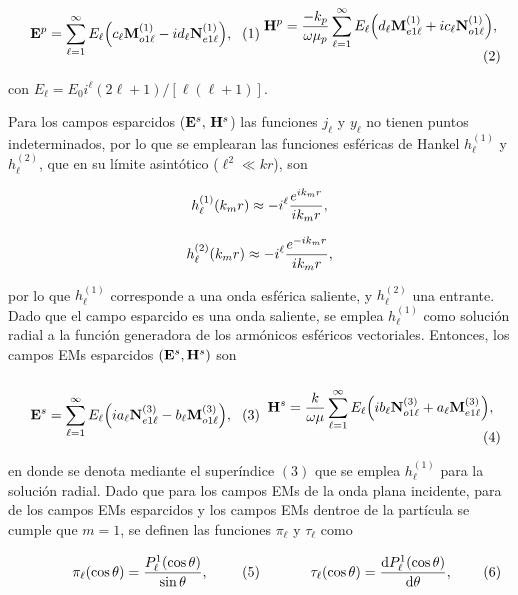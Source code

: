 \documentclass[letterpaper,11pt] {article}
\newcommand{\beqhalf}{\noindent \begin{minipage}[c]{.5\linewidth} \begin{equation}}
\newcommand{\eeqhalf}{\end{equation} \end{minipage} }
\newcommand{\eqhalf}[1]{\beqhalf #1 \eeqhalf}
\begin{document}
	\begin{subequations}
	\eqhalf{\vb{E}^p = \sum_{\ell =1}^\infty E_\ell \qty(c_\ell \vb{M}_{o1\ell}^{(1)}-i d_\ell\vb{N}_{e1\ell}^{(1)}),	\label{eqs:EpAEV}}
	\eqhalf{\vb{H}^p = \frac{-k_p}{\omega\mu_p} \sum_{\ell =1}^\infty E_\ell\qty(d_\ell\vb{M}_{e1\ell}^{(1)}+i c_\ell\vb{N}_{o1\ell}^{(1)}),\label{eqs:HpAEV}}
	\label{eq:EHpAEV}		
	\end{subequations}

\noindent
con $E_\ell =E _0 i^\ell (2\ell+1)/[\ell(\ell+1)]$.

Para los campos esparcidos ($\vb{E}^s,\,\vb{H}^s$) las funciones $j_\ell$ y $y_\ell$ no tienen puntos indeterminados, por lo que se emplearan las funciones esféricas de Hankel $h_\ell^{(1)}$ y $h_\ell^{(2)}$, que en su límite asintótico ($\ell^2\ll kr$), son \cite{bohren1998absorption}

	\eqhalf{h_\ell^{(1)}(k_m r) \approx -i^\ell \frac{e^{ik_m r}}{ik_m r},\notag}
	\eqhalf{h_\ell^{(2)}(k_m r) \approx -i^\ell \frac{e^{-ik_m r}}{ik_m r},\notag}	

\vspace*{-1em}\noindent
por lo que $h_\ell^{(1)}$ corresponde a una onda esférica saliente, y $h_\ell^{(2)}$ una entrante. Dado que el campo esparcido es una onda saliente, se emplea $h_\ell^{(1)}$ como solución radial a la función generadora de los armónicos esféricos vectoriales. Entonces, los campos EMs esparcidos $(\vb{E}^s,\vb{H}^s)$ son 
	\begin{subequations}
	\eqhalf{\vb{E}^s = \sum_{\ell =1}^\infty E_\ell \qty(i a_\ell \vb{N}_{e1\ell}^{(3)}- b_\ell\vb{M}_{o1\ell}^{(3)}),
		\label{eqs:EsAEV}}
	\eqhalf{\vb{H}^s = \frac{k}{\omega\mu} \sum_{\ell =1}^\infty E_\ell\qty(ib_\ell\vb{N}_{o1\ell}^{(3)}+a_\ell\vb{M}_{e1\ell}^{(3)}),
		\label{eqs:HsAEV}}	
	\label{eq:EHsAEV}		
	\end{subequations}
		
\noindent
en donde se denota mediante el superíndice $(3)$ que se emplea $h_\ell^{(1)}$ para la solución radial. Dado que para los campos EMs de la onda plana incidente, para de los campos EMs esparcidos y los campos EMs dentroe de la partícula se cumple que $m= 1$, se definen las funciones   $\pi_\ell$ y $\tau_\ell$ como  

	\begin{subequations}
	\eqhalf{\pi_\ell(\cos\theta)= \frac{P_\ell^1(\cos\theta)}{\sin\theta},
		\label{eqs:pi}}
	\eqhalf{\tau_\ell(\cos\theta) = \dv{P_\ell^1(\cos\theta)}{\theta},
		\label{eqs:tau}}	
	\label{eq:pitau}		
	\end{subequations}
\end{document}
